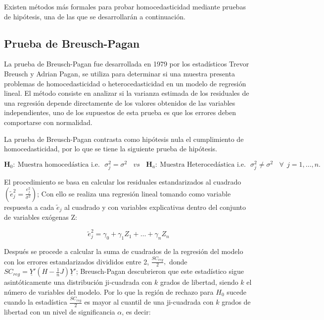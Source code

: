 \documentclass[
  a4paper,
  oneside,
  openany]{book}
\begin{document}
Existen métodos más formales para probar homocedasticidad mediante pruebas de hipótesis, una de las que se desarrollarán a continuación.

\hypertarget{prueba-de-breusch-pagan}{%
\subsection{Prueba de Breusch-Pagan}\label{prueba-de-breusch-pagan}}

La prueba de Breusch-Pagan fue desarrollada en 1979 por los estadísticos Trevor Breusch y Adrian Pagan, se utiliza para determinar si una muestra presenta problemas de homocedasticidad o heterocedasticidad en un modelo de regresión lineal. El método consiste en analizar si la varianza estimada de los residuales de una regresión depende directamente de los valores obtenidos de las variables independientes, uno de los supuestos de esta prueba es que los errores deben comportarse con normalidad.

La prueba de Breusch-Pagan contrasta como hipótesis nula el cumplimiento de homocedasticidad, por lo que se tiene la siguiente prueba de hipótesis.

\[\textbf{H}_0: \ \mbox{Muestra homocedástica  i.e.} \ \ \ \sigma^2_{j}=\sigma^2 \ \ \ \ vs  \ \ \ \
\textbf{H}_a:  \ \mbox{Muestra Heterocedástica  i.e.} \ \ \ \sigma^2_{j} \neq \sigma^2 \ \ \ \ \forall  \ \ j = 1,\ldots,n.\]

El procedimiento se basa en calcular los residuales estandarizados al cuadrado \(\left( \tilde{e}^2_{j}=\frac{e^2_{j}}{\sigma^2}\right)\); Con ello se realiza una regresión lineal tomando como variable respuesta a cada \(\tilde{e}_{j}\) al cuadrado y con variables explicativas dentro del conjunto de variables exógenas Z:

\[\tilde{e}_{j}^{2}=\gamma_{0}+\gamma_{1}Z_{1}+ \ldots + \gamma_{n}Z_{n}\]

Después se procede a calcular la suma de cuadrados de la regresión del modelo con los errores estandarizados divididos entre 2, \(\frac{SC_{reg}}{2},\) donde \(SC_{reg}=\underline{Y}'(H-\frac{1}{n}J)\underline{Y}'\); Breusch-Pagan descubrieron que este estadístico sigue asintóticamente una distribución ji-cuadrada con \(k\) grados de libertad, siendo \(k\) el número de variables del modelo. Por lo que la región de rechazo para \(H_0\) sucede cuando la estadística \(\frac{SC_{reg}}{2}\) es mayor al cuantil de una ji-cuadrada con \(k\) grados de libertad con un nivel de significancia \(\alpha\), es decir:
\end{document}
